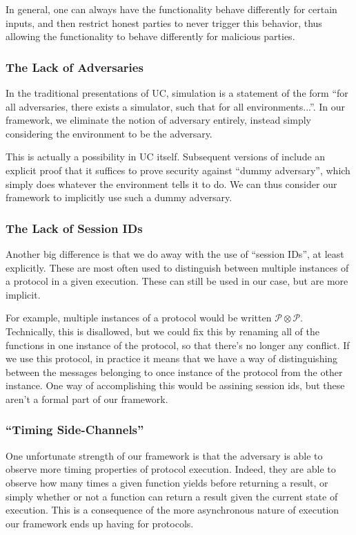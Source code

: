 In general, one can always have the functionality
behave differently for certain inputs,
and then restrict honest parties to never trigger this behavior,
thus allowing the functionality to behave differently
for malicious parties.

\subsubsection*{The Lack of Adversaries}

In the traditional presentations of UC,
simulation is a statement of the form ``for all adversaries,
there exists a simulator, such that for all environments...''.
In our framework, we eliminate the notion of adversary
entirely, instead simply considering the environment
to be the adversary.

This is actually a possibility in UC itself.
Subsequent versions of \cite{EPRINT:Canetti00} include
an explicit proof that it suffices to prove security against ``dummy adversary'',
which simply does whatever the environment tells it to do.
We can thus consider our framework to implicitly use such a dummy adversary.

\subsubsection*{The Lack of Session IDs}

Another big difference is that we do away with the use of ``session IDs'',
at least explicitly.
These are most often used to distinguish between multiple
instances of a protocol in a given execution.
These can still be used in our case, but are more implicit.

For example, multiple instances of a protocol would be written
$\mathscr{P} \otimes \mathscr{P}$.
Technically, this is disallowed, but we could fix this
by renaming all of the functions in one instance of the protocol,
so that there's no longer any conflict.
If we use this protocol, in practice it means that we
have a way of distinguishing between the messages belonging
to once instance of the protocol from the other instance.
One way of accomplishing this would be assining session ids,
but these aren't a formal part of our framework.

\subsubsection*{``Timing Side-Channels''}

One unfortunate strength of our framework is that the adversary
is able to observe more timing properties of protocol execution.
Indeed, they are able to observe how many times a given function
yields before returning a result, or simply whether
or not a function can return a result given the current state of
execution.
This is a consequence of the more asynchronous nature
of execution our framework ends up having for protocols.


